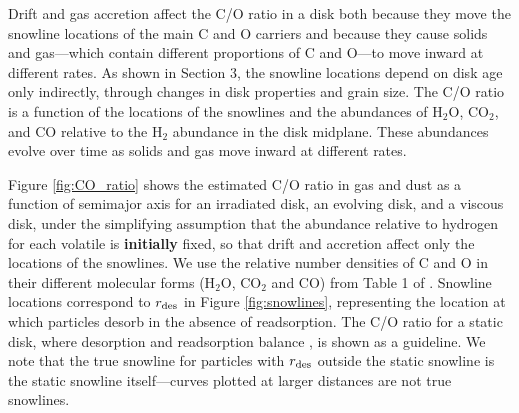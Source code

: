 \documentclass[apj]{emulateapj}
\begin{document}


Drift and gas accretion affect the C/O ratio in a disk both because they move the snowline locations of the main C and O carriers  and because they cause solids and gas---which contain different proportions of C and O---to move inward at different rates.  As shown in Section 3, the snowline locations depend on disk age only indirectly, through changes in disk properties and grain size.  The C/O ratio is a function of the locations of the snowlines and the abundances of H$_2$O, CO$_2$, and CO relative to the H$_2$ abundance in the disk midplane.   These abundances evolve over time as solids and gas move inward at different rates.

Figure \ref{fig:CO_ratio} shows the estimated C/O ratio in gas and dust as a function of semimajor axis for an irradiated disk, an evolving disk, and a viscous disk, under the simplifying assumption that the abundance relative to hydrogen for each volatile is \textbf{initially} fixed, so that drift and accretion affect only the locations of the snowlines. We use the relative number densities of C and O in their different molecular forms (H$_2$O, CO$_2$ and CO) from Table 1 of \citet{oberg11}.  Snowline locations correspond to $r_{\rm des}$ in Figure \ref{fig:snowlines}, representing the location at which particles desorb in the absence of readsorption.  The C/O ratio for a static disk, where desorption and readsorption balance \citep{hollenbach09}, is shown as a guideline. We note that the true snowline for particles with $r_{\rm des}$ outside the static snowline is the static snowline itself---curves plotted at larger distances are not true snowlines.
\end{document}
